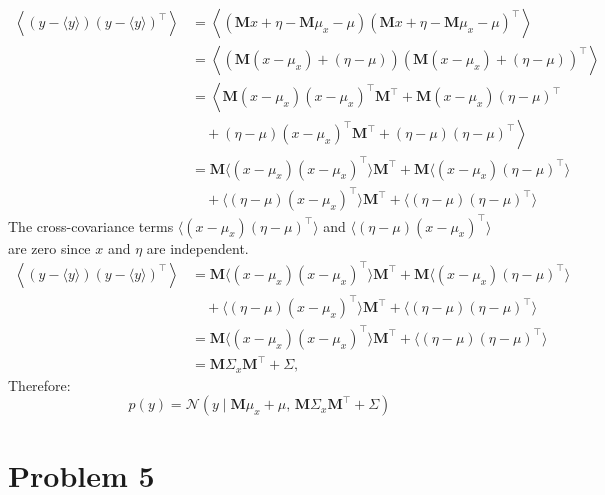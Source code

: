 \documentclass{article}
\begin{document}
\begin{align*}
\left\langle \left( y - \langle y \rangle \right) \left( y - \langle y \rangle \right)^\top \right\rangle &= \left\langle \left( \mathbf{M} x + \eta - \mathbf{M} \mu_x - \mu \right) \left( \mathbf{M} x + \eta - \mathbf{M} \mu_x - \mu \right)^\top \right\rangle \\
&= \left\langle \left( \mathbf{M} (x - \mu_x) + (\eta - \mu) \right) \left( \mathbf{M} (x - \mu_x) + (\eta - \mu) \right)^\top \right\rangle \\
&= \left\langle \mathbf{M} (x - \mu_x) (x - \mu_x)^\top \mathbf{M}^\top + \mathbf{M} (x - \mu_x) (\eta - \mu)^\top \right. \\
&\quad + \left. (\eta - \mu) (x - \mu_x)^\top \mathbf{M}^\top + (\eta - \mu) (\eta - \mu)^\top \right\rangle \\
&= \mathbf{M} \langle (x - \mu_x) (x - \mu_x)^\top \rangle \mathbf{M}^\top + \mathbf{M} \langle (x - \mu_x) (\eta - \mu)^\top \rangle \\
&\quad + \langle (\eta - \mu) (x - \mu_x)^\top \rangle \mathbf{M}^\top + \langle (\eta - \mu) (\eta - \mu)^\top \rangle
\end{align*}
The cross-covariance terms $\langle (x - \mu_x)(\eta - \mu)^\top \rangle$ and $\langle (\eta - \mu)(x - \mu_x)^\top \rangle $ are zero since $x$ and $\eta$ are independent. 
\begin{align*}
\left\langle \left( y - \langle y \rangle \right) \left( y - \langle y \rangle \right)^\top \right\rangle 
&= \mathbf{M} \langle (x - \mu_x)(x - \mu_x)^\top \rangle \mathbf{M}^\top + \mathbf{M} \langle (x - \mu_x)(\eta - \mu)^\top \rangle \\
&\quad + \langle (\eta - \mu)(x - \mu_x)^\top \rangle \mathbf{M}^\top + \langle (\eta - \mu)(\eta - \mu)^\top \rangle \\
&= \mathbf{M} \langle (x - \mu_x)(x - \mu_x)^\top \rangle \mathbf{M}^\top + \langle (\eta - \mu)(\eta - \mu)^\top \rangle \\
&= \mathbf{M} \Sigma_x \mathbf{M}^\top + \Sigma,
\end{align*}
Therefore:
\[
p(y) = \mathcal{N} \left( y \mid \mathbf{M} \mu_x + \mu, \, \mathbf{M} \Sigma_x \mathbf{M}^\top + \Sigma \right)
\]

\section*{Problem 5}
\end{document}

